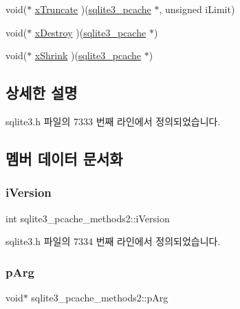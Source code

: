 \begin{DoxyCompactItemize}
\item 
void($\ast$ \hyperlink{structsqlite3__pcache__methods2_a711d60b1895622a10186a2894cef1383}{x\+Truncate} )(\hyperlink{sqlite3_8h_a096c453d937d51f7926d7d31c8e0bd2f}{sqlite3\+\_\+pcache} $\ast$, unsigned i\+Limit)
\item 
void($\ast$ \hyperlink{structsqlite3__pcache__methods2_a17a43db31d015c29e44d68c752682365}{x\+Destroy} )(\hyperlink{sqlite3_8h_a096c453d937d51f7926d7d31c8e0bd2f}{sqlite3\+\_\+pcache} $\ast$)
\item 
void($\ast$ \hyperlink{structsqlite3__pcache__methods2_a225971a193ff429d9f1339aca39c7755}{x\+Shrink} )(\hyperlink{sqlite3_8h_a096c453d937d51f7926d7d31c8e0bd2f}{sqlite3\+\_\+pcache} $\ast$)
\end{DoxyCompactItemize}


\subsection{상세한 설명}


sqlite3.\+h 파일의 7333 번째 라인에서 정의되었습니다.



\subsection{멤버 데이터 문서화}
\mbox{\label{structsqlite3__pcache__methods2_a03b27be6c7cb8f1d2662c454cbe58483}} 
\subsubsection{\texorpdfstring{i\+Version}{iVersion}}
{\footnotesize\ttfamily int sqlite3\+\_\+pcache\+\_\+methods2\+::i\+Version}



sqlite3.\+h 파일의 7334 번째 라인에서 정의되었습니다.

\mbox{\label{structsqlite3__pcache__methods2_aee83131f16bb88218d7b0339854719d6}} 
\subsubsection{\texorpdfstring{p\+Arg}{pArg}}
{\footnotesize\ttfamily void$\ast$ sqlite3\+\_\+pcache\+\_\+methods2\+::p\+Arg}




